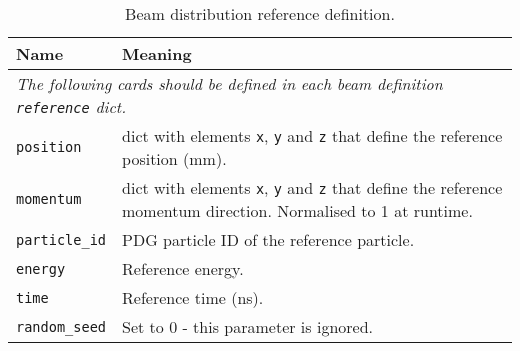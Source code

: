 \begin{table*}
\begin{center}
\caption{Beam distribution reference definition.}
\begin{tabularx}{\linewidth}{lX}
Name & Meaning \\
\hline
\multicolumn{2}{|l|}{\emph{The following cards should be defined in each beam definition \verb|reference| dict.}} \\
\hline
\verb|position| & dict with elements \verb|x|, \verb|y| and \verb|z| that define the reference position (mm).\\
\verb|momentum| & dict with elements \verb|x|, \verb|y| and \verb|z| that define the reference momentum direction. Normalised to 1 at runtime.\\
\verb|particle_id| & PDG particle ID of the reference particle.\\
\verb|energy| & Reference energy. \\
\verb|time| & Reference time (ns). \\
\verb|random_seed| & Set to 0 - this parameter is ignored.\\
\end{tabularx}
\end{center}
\end{table*}

